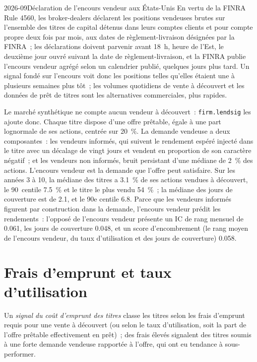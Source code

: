 \begin{dated}{2026-09}{Déclaration de l'encours vendeur aux États-Unis}\label{dat:s1:short-interest-borrow-and-crowding:finra}
En vertu de la FINRA Rule 4560, les broker-dealers déclarent les positions vendeuses brutes sur l'ensemble des titres de capital détenus dans leurs comptes clients et pour compte propre deux fois par
mois, aux dates de règlement-livraison désignées par la FINRA~; les déclarations doivent parvenir avant 18~h, heure de l'Est, le deuxième jour ouvré suivant la date de règlement-livraison, et la FINRA
publie l'encours vendeur agrégé selon un calendrier publié, quelques jours plus tard. Un signal fondé sur l'encours voit donc les positions telles qu'elles étaient une à
plusieurs semaines plus tôt~; les volumes quotidiens de vente à découvert et les données de prêt de titres sont les alternatives commerciales, plus rapides.
\end{dated}

Le marché synthétique ne compte aucun vendeur à découvert~: \texttt{firm.lendsig} les ajoute donc. Chaque titre dispose d'une offre prêtable, égale à une part lognormale de ses actions, centrée sur
20~\%. La demande vendeuse a deux composantes~: les vendeurs informés, qui suivent le rendement espéré injecté dans le titre avec un décalage de vingt jours et vendent en proportion de
son caractère négatif~; et les vendeurs non informés, bruit persistant d'une médiane de 2~\% des actions. L'encours vendeur est la demande que l'offre peut satisfaire. Sur les années 3 à
10, la médiane des titres a 3.1~\% de ses actions vendues à découvert, le 90~centile 7.5~\% et le titre le plus vendu 54~\%~; la médiane des jours de couverture est de 2.1, et le 90e
centile 6.8. Parce que les vendeurs informés figurent par construction dans la demande, l'encours vendeur prédit les rendements~: l'opposé de l'encours vendeur présente un IC de rang mensuel de
0.061, les jours de couverture 0.048, et un score d'encombrement (le rang moyen de l'encours vendeur, du taux d'utilisation et des jours de couverture) 0.058.

\section{Frais d'emprunt et taux d'utilisation}

\begin{definition}\label{def:s1:short-interest-borrow-and-crowding:fee}
Un \emph{signal du coût d'emprunt des titres} classe les titres selon les frais d'emprunt requis pour une vente à découvert (ou selon le taux d'utilisation, soit la part de l'offre prêtable
effectivement en prêt)~; des frais élevés signalent des titres soumis à une forte demande vendeuse rapportée à l'offre, qui ont eu tendance à sous-performer.
\end{definition}


